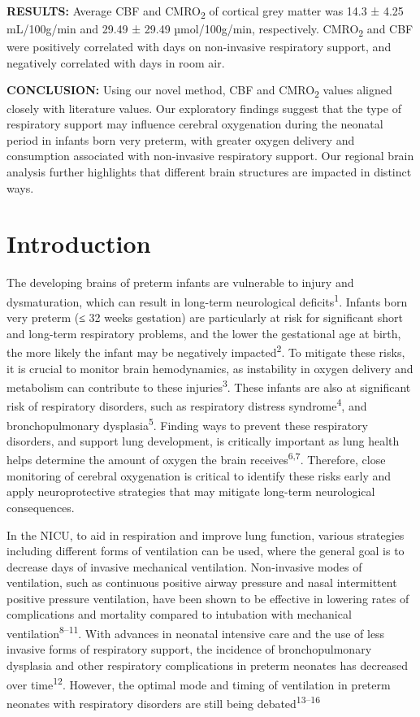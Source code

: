 \documentclass[
  letterpaper,
  DIV=11,
  numbers=noendperiod]{scrartcl}
\begin{document}
\textbf{RESULTS:} Average CBF and CMRO\textsubscript{2} of cortical grey
matter was 14.3 ± 4.25 mL/100g/min and 29.49 ± 29.49 µmol/100g/min,
respectively. CMRO\textsubscript{2} and CBF were positively correlated
with days on non-invasive respiratory support, and negatively correlated
with days in room air.

\textbf{CONCLUSION:} Using our novel method, CBF and
CMRO\textsubscript{2} values aligned closely with literature values. Our
exploratory findings suggest that the type of respiratory support may
influence cerebral oxygenation during the neonatal period in infants
born very preterm, with greater oxygen delivery and consumption
associated with non-invasive respiratory support. Our regional brain
analysis further highlights that different brain structures are impacted
in distinct ways.

\section{Introduction}\label{sec-intro}

The developing brains of preterm infants are vulnerable to injury and
dysmaturation, which can result in long-term neurological
deficits\textsuperscript{1}. Infants born very preterm (≤ 32 weeks
gestation) are particularly at risk for significant short and long-term
respiratory problems, and the lower the gestational age at birth, the
more likely the infant may be negatively impacted\textsuperscript{2}. To
mitigate these risks, it is crucial to monitor brain hemodynamics, as
instability in oxygen delivery and metabolism can contribute to these
injuries\textsuperscript{3}. These infants are also at significant risk
of respiratory disorders, such as respiratory distress
syndrome\textsuperscript{4}, and bronchopulmonary
dysplasia\textsuperscript{5}. Finding ways to prevent these respiratory
disorders, and support lung development, is critically important as lung
health helps determine the amount of oxygen the brain
receives\textsuperscript{6,7}. Therefore, close monitoring of cerebral
oxygenation is critical to identify these risks early and apply
neuroprotective strategies that may mitigate long-term neurological
consequences.

In the NICU, to aid in respiration and improve lung function, various
strategies including different forms of ventilation can be used, where
the general goal is to decrease days of invasive mechanical ventilation.
Non-invasive modes of ventilation, such as continuous positive airway
pressure and nasal intermittent positive pressure ventilation, have been
shown to be effective in lowering rates of complications and mortality
compared to intubation with mechanical
ventilation\textsuperscript{8--11}. With advances in neonatal intensive
care and the use of less invasive forms of respiratory support, the
incidence of bronchopulmonary dysplasia and other respiratory
complications in preterm neonates has decreased over
time\textsuperscript{12}. However, the optimal mode and timing of
ventilation in preterm neonates with respiratory disorders are still
being debated\textsuperscript{13--16}
\end{document}
